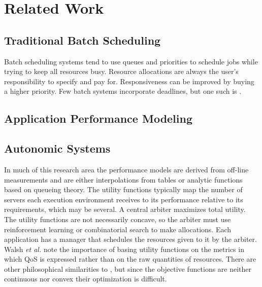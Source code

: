 \section{Related Work}\label{related_work}
\subsection*{Traditional Batch Scheduling}
Batch scheduling systems\cite{Feit97,FRS04} tend to use queues and priorities to schedule jobs while trying to keep all resources busy.
Resource allocations are always the user's responsibility to specify and pay for.
Responsiveness can be improved by buying a higher priority.
Few batch systems incorporate deadlines, but one such is \cite{AKKMS95}.
 
\subsection*{Application Performance Modeling}


\subsection*{Autonomic Systems}
%	
%
%	
%
In much of this research area\cite{1078472,1078493,1285843,1345325}
the performance models are derived from off-line measurements and are either
interpolations from tables or analytic functions based on queueing theory.
The utility functions typically map the number of servers each execution environment receives
to its performance relative to its requirements, which may be several.
A central arbiter maximizes total utility. The utility functions are not necessarily concave,
so the arbiter must use reinforcement learning or combinatorial search to make allocations.
Each application has a manager that schedules the resources given to it by the arbiter.
%
Walsh \emph{et al.}\cite{1078411} note the importance of basing utility functions
on the metrics in which QoS is expressed rather than on the raw quantities of resources.
There are other philosophical similarities to \pacora,
but since the objective functions are neither continuous nor convex their optimization is difficult.

